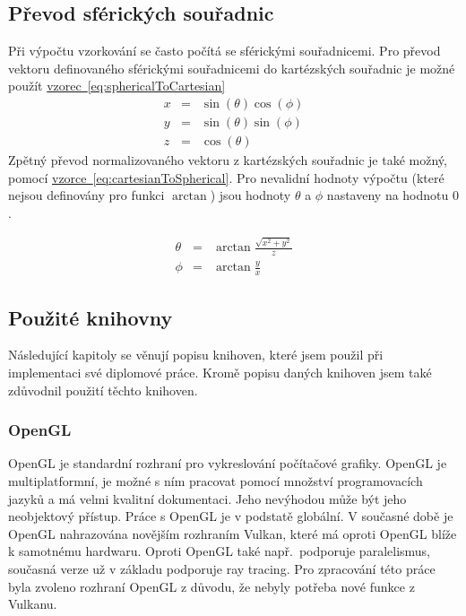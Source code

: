 \documentclass[czech,master]{diploma}
\begin{document}
\subsection{Převod sférických souřadnic}
Při výpočtu vzorkování se často počítá se sférickými souřadnicemi. Pro převod vektoru definovaného sférickými souřadnicemi do kartézských souřadnic je možné použít \hyperref[eq:sphericalToCartesian]{vzorec~\ref{eq:sphericalToCartesian}}
\begin{eqnarray}
  x & = & \sin(\theta)\cos(\phi)\nonumber \\
  y & = & \sin(\theta)\sin(\phi)\nonumber \\
  z & = & \cos(\theta)\label{eq:sphericalToCartesian}
\end{eqnarray}
Zpětný převod normalizovaného vektoru z kartézských souřadnic je také možný, pomocí \hyperref[eq:cartesianToSpherical]{vzorce~\ref{eq:cartesianToSpherical}}. Pro nevalidní hodnoty výpočtu (které nejsou definovány pro funkci \(\arctan\)) jsou hodnoty \(\theta\) a \(\phi\) nastaveny na hodnotu \(0\).

\begin{eqnarray}
  \theta & = & \arctan \frac{\sqrt{x^2 + y^2}}{z} \nonumber \\
  \phi & = & \arctan \frac{y}{x}\label{eq:cartesianToSpherical}
\end{eqnarray}

\subsection{Použité knihovny}
Následující kapitoly se věnují popisu knihoven, které jsem použil při implementaci své diplomové práce. Kromě popisu daných knihoven jsem také zdůvodnil použití těchto knihoven.

\subsubsection*{OpenGL}
OpenGL je standardní rozhraní pro vykreslování počítačové grafiky. OpenGL je multiplatformní, je možné s ním pracovat pomocí množství programovacích jazyků a má velmi kvalitní dokumentaci. Jeho nevýhodou může být jeho neobjektový přístup. Práce s OpenGL je v podstatě globální. V současné době je OpenGL nahrazována novějším rozhraním Vulkan, které má oproti OpenGL blíže k samotnému hardwaru. Oproti OpenGL také např.\ podporuje paralelismus, současná verze už v základu podporuje ray tracing. Pro zpracování této práce byla zvoleno rozhraní OpenGL z důvodu, že nebyly potřeba nové funkce z Vulkanu.
\end{document}
